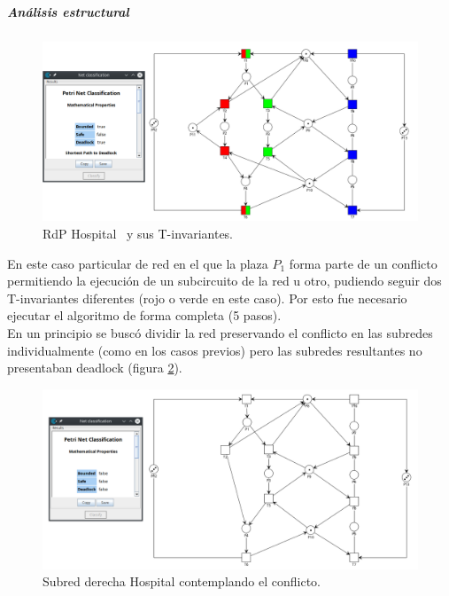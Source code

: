 \subparagraph{Análisis estructural}
\hfill
\begin{figure}[H]
	\centering
	\includegraphics[scale=0.4]{Figures/algoritmo3/Hospital1.png}
	\caption[RdP Hospital y sus T-invariantes.]{RdP Hospital \footnotemark \ y sus T-invariantes.}
	\label{fig:onosdistribuido}
 \end{figure} 

En este caso particular de red en el que la plaza $P_1$ forma parte de un conflicto permitiendo la ejecución de un subcircuito de la red u otro, pudiendo seguir dos T-invariantes diferentes (rojo o verde en este caso).
Por esto fue necesario ejecutar el algoritmo de forma completa (5 pasos).\\

En un principio se buscó dividir la red preservando el conflicto en las subredes individualmente (como en los casos previos) pero las subredes resultantes no presentaban deadlock (figura \ref{fig:hospitalsubredderechaconflicto}).

\hfill
\begin{figure}[H]
	\centering
	\includegraphics[scale=0.4]{Figures/algoritmo3/Hospital2.png}
	\caption{Subred derecha Hospital contemplando el conflicto.}
	\label{fig:hospitalsubredderechaconflicto}
 \end{figure}

